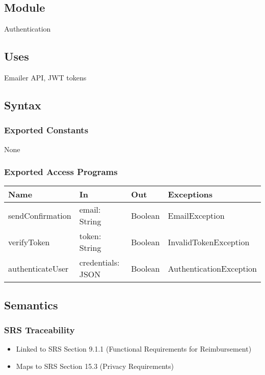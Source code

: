\documentclass[12pt, titlepage]{article}
\begin{document}
\subsection{Module}
Authentication

\subsection{Uses}
Emailer API, JWT tokens

\subsection{Syntax}

\subsubsection{Exported Constants}
None

\subsubsection{Exported Access Programs}
\begin{center}
\begin{tabular}{p{4cm} p{4cm} p{4cm} p{2cm}}
\hline
\textbf{Name} & \textbf{In} & \textbf{Out} & \textbf{Exceptions} \\
\hline
sendConfirmation & email: String & Boolean & EmailException \\
verifyToken & token: String & Boolean & InvalidTokenException \\
authenticateUser & credentials: JSON & Boolean & AuthenticationException \\
\hline
\end{tabular}
\end{center}

\subsection{Semantics}

\subsubsection{SRS Traceability}
\begin{itemize}
  \item Linked to SRS Section 9.1.1 (Functional Requirements for Reimbursement)
  \item Maps to SRS Section 15.3 (Privacy Requirements)
\end{itemize}
\end{document}
